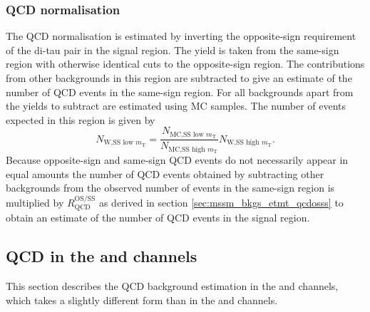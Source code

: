 \subsubsection{QCD normalisation}
\label{sec:mssm_bkgs_etmt_qcdnorm}
The QCD normalisation is estimated by inverting the opposite-sign requirement
of the di-tau pair in the signal region. The yield is taken from the same-sign
region with otherwise identical cuts to the opposite-sign region. The contributions
from other backgrounds in this region are subtracted to give an estimate of the number
of QCD events in the same-sign region. For all backgrounds apart from \Wjets the
yields to subtract are estimated using \ac{MC} samples. The number of \Wjets events
expected in this region is given by
\begin{equation}\label{eqn:wjets_qcdsub}
N_{\text{W,SS low }m_{\text{T}}} = \frac{N_{\text{MC,SS low }m_{\text{T}}}}{N_{\text{MC,SS high }m_{\text{T}}}}N_{\text{W,SS high }m_{\text{T}}}.
\end{equation}
Because opposite-sign and same-sign QCD events do not
necessarily appear in equal amounts the number of QCD
events obtained by subtracting other backgrounds from the
observed number of events in the same-sign region is multiplied
by $R_{\text{QCD}}^{\text{OS/SS}}$ as derived in section \ref{sec:mssm_bkgs_etmt_qcdosss} 
to obtain an estimate of the number of QCD events in the signal region.

\subsection{\texorpdfstring{QCD in the \tautau and \emu channels}{QCD in the tautau and emu channels}}
\label{sec:mssm_bkgs_qcd}
This section describes the QCD background
estimation in the \tautau and \emu channels, which takes a slightly
different form than in the \mutau and \etau channels.

